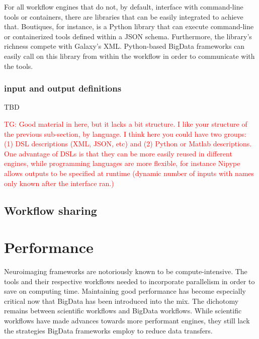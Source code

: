 \documentclass{report}
\newcommand{\tristan}[1]{\textcolor{red}{TG: #1}}
\begin{document}
            For all workflow engines that do not, by default, interface with 
            command-line tools or containers, there are libraries that can be
            easily integrated to achieve that. Boutiques, for instance, is a 
            Python library that can execute command-line or containerized tools
            defined within a JSON schema. Furthermore, the library's richness
            compete with Galaxy's XML. Python-based BigData frameworks can 
            easily call on this library from within the workflow in order to
            communicate with the tools.

            \subsection{input and output definitions}
                TBD

            \tristan{Good material in here, but it lacks a bit structure.
            I like your structure of the previous sub-section, by language. I think
            here you could have two groups: (1) DSL descriptions (XML, JSON, etc) and (2)
            Python or Matlab descriptions. One advantage of DSLs is that they can 
            be more easily reused in different engines, while programming languages
            are more flexible, for instance Nipype allows outputs to be specified
            at runtime (dynamic number of inputs with names only known after
            the interface ran.)}


        \section{Workflow sharing}\label{sharing}
            
            
    \chapter{Performance}\label{performance}
        Neuroimaging frameworks are notoriously known to be compute-intensive.
        The tools and their respective workflows needed to incorporate 
        parallelism in order to save on computing time. Maintaining good 
        performance has become especially critical now that BigData has been
        introduced into the mix. The dichotomy remains between scientific 
        workflows and BigData workflows. While scientific workflows have made
        advances towards more performant engines, they still lack the 
        strategies BigData frameworks employ to reduce data transfers. 
        
\end{document}
